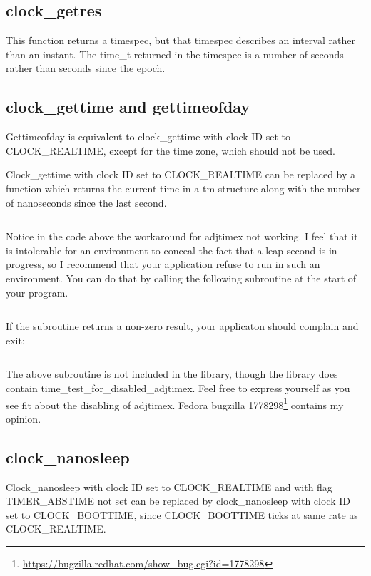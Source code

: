 \documentclass[letterpaper,twoside]{article}
\begin{document}
\subsection{clock\_getres}
This function returns a timespec, but that timespec describes an interval
rather than an instant.  The {\ttfamily time\_t} returned in the timespec is a
number of seconds rather than seconds since the epoch.

\subsection{clock\_gettime and gettimeofday}
Gettimeofday is equivalent to clock\_gettime with clock ID set to
CLOCK\_REAL\-TIME, except for the time zone, which should not be used.

Clock\_gettime with clock ID set to CLOCK\_REAL\-TIME can be replaced by
a function which returns the current time in a {\ttfamily tm} structure along
with the number of nanoseconds since the last second.
\inputminted[firstline=34]{c}{src/time_current_tm_nano.c}

Notice in the code above the workaround for {\ttfamily adjtimex}
not working.  I feel that it is intolerable for an environment to
conceal the fact that a leap second is in progress, so I recommend
that your application refuse to run in such an environment.  You
can do that by calling the following subroutine at the start
of your program.
\inputminted[firstline=36]{c}{src/time_test_for_disabled_adjtimex.c}
If the subroutine returns a non-zero result, your applicaton should
complain and exit:
\inputminted[firstline=47,lastline=67]{c}{tests/test_for_disabled_adjtimex.c}
The above subroutine is not included in the library, though
the library does contain
{\ttfamily time\_test\_for\_disabled\_adjtimex}.
Feel free to express yourself as you see fit about the disabling
of {\ttfamily adjtimex}.  Fedora bugzilla
\num{1778298}\footnote{\href{https://bugzilla.redhat.com/show_bug.cgi?id=1778298}{https://bugzilla.redhat.com/show\_bug.cgi?id=1778298}}
contains my opinion.

\subsection{clock\_nanosleep}
Clock\_nanosleep with clock ID set to CLOCK\_REAL\-TIME and with flag
TIMER\_ABS\-TIME not set can be replaced by clock\_nanosleep with
clock ID set to CLOCK\_BOOTTIME, since CLOCK\_BOOTTIME ticks at
same rate as CLOCK\_REAL\-TIME.
\end{document}
